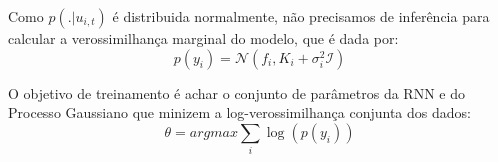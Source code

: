 Como $p(. | u_{i,t})$ é distribuida normalmente, não precisamos de inferência para calcular a verossimilhança marginal do modelo, que é dada por: \\

\[
p(y_{i}) = \mathcal{N}(f_i,K_i + \sigma_i^2\mathcal{I})
\]

O objetivo de treinamento é achar o conjunto de parâmetros da RNN e do Processo Gaussiano que minizem a log-verossimilhança conjunta dos dados: \\

\[
\theta = argmax \sum_i{\log(p(y_i))}
\]


